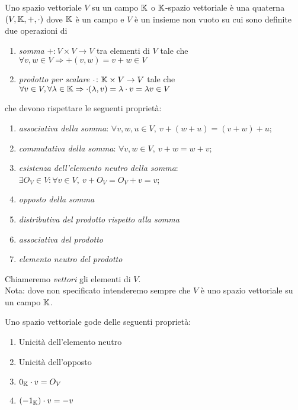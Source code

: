 \begin{definition}
	Uno spazio vettoriale $ V $ su un campo $ \mathbb{K} $ o $ \mathbb{K} $-spazio vettoriale è una quaterna $ (V, \mathbb{K}, +, \cdot) $ dove $ \mathbb{K} $ è un campo e $ V $ è un insieme non vuoto su cui sono definite due operazioni di 
	\begin{enumerate}
		\item \emph{somma} $ + \colon V \times V \to V $ tra elementi di $ V $ tale che $ \forall v, w \in V \Rightarrow + (v, w) = v + w \in V $
		\item \emph{prodotto per scalare} $ \cdot \colon \mathbb{K} \times V \to V $ tale che $ \forall v \in V, \forall \lambda \in \mathbb{K} \Rightarrow \cdot (\lambda, v) = \lambda \cdot v = \lambda v \in V $
	\end{enumerate}
	che devono rispettare le seguenti proprietà:
	\begin{enumerate}[label=(\roman*)]
		\item \emph{associativa della somma}: $ \forall v, w, u \in V, \ v + (w + u) = (v + w) + u $;
		\item \emph{commutativa della somma}: $ \forall v, w \in V, \ v + w = w + v $;
		\item \emph{esistenza dell'elemento neutro della somma}: $ \exists O_{V} \in V : \forall v \in V, \ v + O_{V} = O_{V} + v = v $;
		\item \emph{opposto della somma}
		\item \emph{distributiva del prodotto rispetto alla somma}
		\item \emph{associativa del prodotto}
		\item \emph{elemento neutro del prodotto}
	\end{enumerate}
	Chiameremo \emph{vettori} gli elementi di $ V $. \\
	\textsf{Nota: dove non specificato intenderemo sempre che $ V $ è uno spazio vettoriale su un campo $ \mathbb{K} $.}
\end{definition}

\begin{propriety} Uno spazio vettoriale gode delle seguenti proprietà:
	\begin{enumerate}
		\item Unicità dell'elemento neutro
		\item Unicità dell'opposto
		\item $ 0_{\mathbb{K}} \cdot v = O_V $
		\item $ (-1_{\mathbb{K}}) \cdot v = -v $
	\end{enumerate}
\end{propriety}

